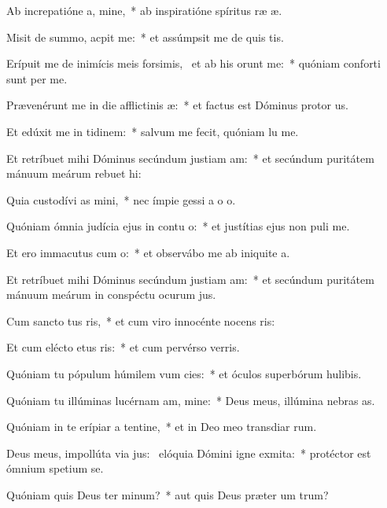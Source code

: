 \item Ab increpatióne a, mine,~* ab inspiratióne spíritus ræ æ.
\item Misit de summo,  acpit me:~* et assúmpsit me de quis tis.
\item Erípuit me de inimícis meis forsimis,~\pscross{} et ab his  orunt me:~* quóniam conforti sunt per me.
\item Prævenérunt me in die afflictinis æ:~* et factus est Dóminus protor us.
\item Et edúxit me in tidinem:~* salvum me fecit, quóniam lu me.
\item Et retríbuet mihi Dóminus secúndum justiam am:~* et secúndum puritátem mánuum meárum rebuet hi:
\item Quia custodívi as mini,~* nec ímpie gessi a o o.
\item Quóniam ómnia judícia ejus in contu o:~* et justítias ejus non puli  me.
\item Et ero immacutus cum o:~* et observábo me ab iniquite a.
\item Et retríbuet mihi Dóminus secúndum justiam am:~* et secúndum puritátem mánuum meárum in conspéctu ocurum jus.
\item Cum sancto tus ris,~* et cum viro innocénte nocens ris:
\item Et cum elécto etus ris:~* et cum pervérso verris.
\item Quóniam tu pópulum húmilem vum cies:~* et óculos superbórum hulibis.
\item Quóniam tu illúminas lucérnam am, mine:~* Deus meus, illúmina nebras as.
\item Quóniam in te erípiar a tentine,~* et in Deo meo transdiar rum.
\item Deus meus, impollúta via jus:~\pscross{} elóquia Dómini igne exmita:~* protéctor est ómnium spetium  se.
\item Quóniam quis Deus ter minum?~* aut quis Deus præter um trum?
